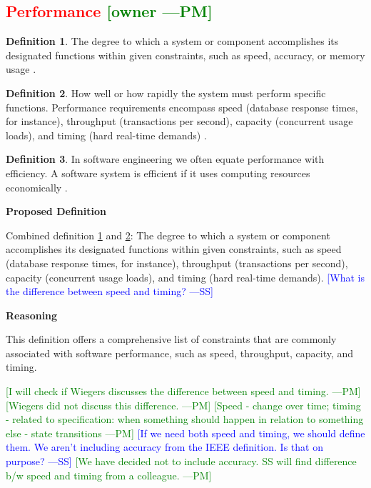 \documentclass[letterpaper,cleveref]{lipics-v2019}
\newcommand{\authornote}[3]{\textcolor{#1}{[#3 ---#2]}}
\newcommand{\authornote}[3]{}
\newcommand{\wss}[1]{\authornote{blue}{SS}{#1}} %
\newcommand{\pmi}[1]{\authornote{green}{PM}{#1}} %
\newcommand{\notdone}[1]{\textcolor{red}{#1}}
\theoremstyle{definition}
\newtheorem{defn}{Definition}
\begin{document}
\subsection{\notdone{Performance} \pmi{owner}}

\begin{defn} \label{PerformanceDefnSelected}
	The degree to which a system or component accomplishes its designated functions
	within given constraints, such as speed, accuracy, or memory usage
	\citep{IEEEStdGlossarySET1990}.
\end{defn}
\begin{defn} \label{PerformanceDefnSelected2}
	How well or how rapidly the system must perform specific functions. Performance
	requirements encompass speed (database response times, for instance), throughput
	(transactions per second), capacity (concurrent usage loads), and timing (hard
	real-time demands) \citep{wiegers2003softreq}.
\end{defn}
\begin{defn}
	In software engineering we often equate performance with efficiency. A software system is efficient if it uses computing resources economically
	\citep{ghezzi1991fundamentals}.
\end{defn}

\noindent \textbf{Proposed Definition}

Combined definition \ref{PerformanceDefnSelected} and
\ref{PerformanceDefnSelected2}: The degree to which a system or component
accomplishes its designated functions within given constraints, such as speed
(database response times, for instance), throughput (transactions per second),
capacity (concurrent usage loads), and timing (hard real-time
demands). \wss{What is the difference between speed and timing?}

\noindent \textbf{Reasoning}

This definition offers a comprehensive list of constraints that are commonly
associated with software performance, such as speed, throughput, capacity, and
timing.

\pmi{I will check if Wiegers discusses the difference between speed and timing.}
\pmi{Wiegers did not discuss this difference.}
\pmi{Speed - change over time; timing - related to specification: when something
	should happen in relation to something else - state transitions}
\wss{If we need both speed and timing, we should define them.  We aren't
  including accuracy from the IEEE definition.  Is that on purpose?}
\pmi{We have decided not to include accuracy. SS will find difference b/w speed and timing from a colleague.}
\end{document}
